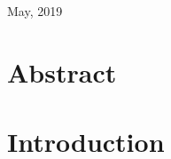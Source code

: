 \documentclass[11pt, twocolumn]{article}
\begin{document}
\begin{titlepage}
		
		\vfill\vfill\vfill %
		
		{\large May, 2019} %
		
		
		
		
		\vfill %
		
	\end{titlepage}

\newpage
\twocolumn
\tableofcontents
\printacronyms[name=Acronyms]
\section*{Abstract}

\section*{Introduction}
\end{document}
